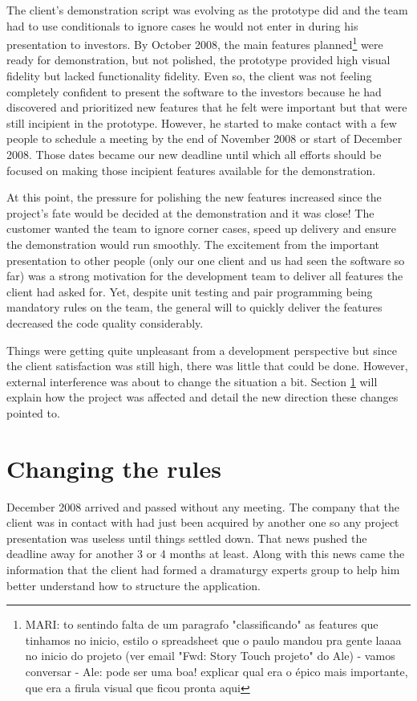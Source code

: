 \documentclass[lnbip]{svmultln}
\newcommand{\mari}[1]{\footnote{MARI: #1}}
\begin{document}
The client's demonstration script was evolving as the prototype did and the team had to use conditionals to ignore cases he would not enter in during his presentation to investors. By October 2008, the main features planned\mari{to sentindo falta de um paragrafo "classificando" as features que tinhamos no inicio, estilo o spreadsheet que o paulo mandou pra gente laaaa no inicio do projeto (ver email "Fwd: Story Touch projeto" do Ale) - vamos conversar - Ale: pode ser uma boa! explicar qual era o épico mais importante, que era a firula visual que ficou pronta aqui} were ready for demonstration, but not polished, the prototype provided high visual fidelity but lacked functionality fidelity. Even so, the client was not feeling completely confident to present the software to the investors because he had discovered and prioritized new features that he felt were important but that were still incipient in the prototype. However, he started to make contact with a few people to schedule a meeting by the end of November 2008 or start of December 2008. Those dates became our new deadline until which all efforts should be focused on making those incipient features available for the demonstration.

At this point, the pressure for polishing the new features increased since the project's fate would be decided at the demonstration and it was close! The customer wanted the team to ignore corner cases, speed up delivery and ensure the demonstration would run smoothly. The excitement from the important presentation to other people (only our one client and us had seen the software so far) was a strong motivation for the development team to deliver all features the client had asked for. Yet, despite unit testing and pair programming being mandatory rules on the team, the general will to quickly deliver the features decreased the code quality considerably.

Things were getting quite unpleasant from a development perspective but since the client satisfaction was still high, there was little that could be done. However, external interference was about to change the situation a bit. Section \ref{sec:changes} will explain how the project was affected and detail the new direction these changes pointed to.

\section{Changing the rules}
\label{sec:changes}

December 2008 arrived and passed without any meeting. The company that
the client was in contact with had just been acquired by another one
so any project presentation was useless until things settled
down. That news pushed the deadline away for another 3 or 4 months at
least. Along with this news came the information that the client had
formed a dramaturgy experts group to help him better understand how to
structure the application.
\end{document}
